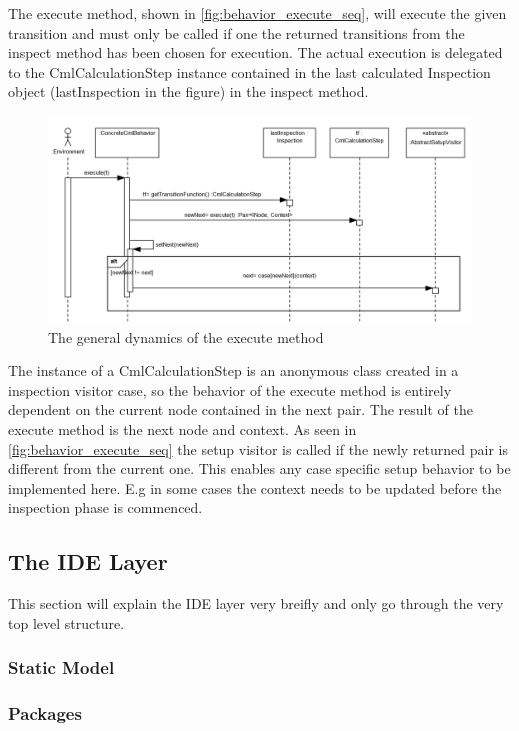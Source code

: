 \documentclass[a4paper, 10pt]{include/compassreport}   %
\begin{document}
The execute method, shown in \autoref{fig:behavior_execute_seq}, will
execute the given transition and must only be called if one the
returned transitions from the inspect method has been chosen for
execution. The actual execution is delegated to the CmlCalculationStep
instance contained in the last calculated Inspection object
(lastInspection in the figure) in the inspect method.
\begin{figure}[ht!]
  \begin{center}
    \includegraphics[width=1\textwidth]{figures/behavior-execute-seq}
    \caption{The general dynamics of the execute method}
    \label{fig:behavior_execute_seq}
  \end{center}
\end{figure}
The instance of a CmlCalculationStep is an anonymous class created in
a inspection visitor case, so the behavior of the execute method is
entirely dependent on the current node contained in the next pair. The
result of the execute method is the next node and context. As seen in
\autoref{fig:behavior_execute_seq} the setup visitor is called if the
newly returned pair is different from the current one. This enables
any case specific setup behavior to be implemented here. E.g in some
cases the context needs to be updated before the inspection phase is
commenced.

\subsection{The IDE Layer}
This section will explain the IDE layer very breifly and only go
through the very top level structure.

\subsubsection{Static Model}

\subsubsection*{Packages}
\end{document}

